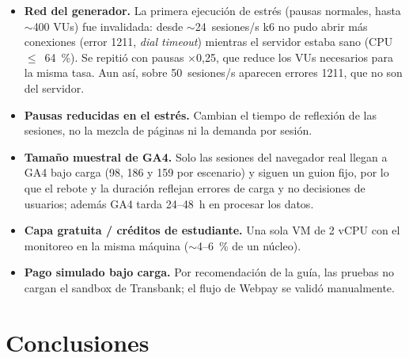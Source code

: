\documentclass[11pt,a4paper]{article}
\begin{document}
\begin{itemize}
  \item \textbf{Red del generador.} La primera ejecución de estrés (pausas
        normales, hasta $\sim$400 VUs) fue invalidada: desde $\sim$24~sesiones/s
        k6 no pudo abrir más conexiones (error 1211, \emph{dial timeout}) mientras
        el servidor estaba sano (CPU $\le$~64~\%). Se repitió con pausas
        $\times$0,25, que reduce los VUs necesarios para la misma tasa. Aun así,
        sobre 50~sesiones/s aparecen errores 1211, que no son del servidor.
  \item \textbf{Pausas reducidas en el estrés.} Cambian el tiempo de reflexión de
        las sesiones, no la mezcla de páginas ni la demanda por sesión.
  \item \textbf{Tamaño muestral de GA4.} Solo las sesiones del navegador real
        llegan a GA4 bajo carga (98, 186 y 159 por escenario) y siguen un
        guion fijo, por lo que el rebote y la duración reflejan errores de
        carga y no decisiones de usuarios; además GA4 tarda 24--48~h en
        procesar los datos.
  \item \textbf{Capa gratuita / créditos de estudiante.} Una sola VM de 2 vCPU
        con el monitoreo en la misma máquina ($\sim$4--6~\% de un núcleo).
  \item \textbf{Pago simulado bajo carga.} Por recomendación de la guía, las
        pruebas no cargan el sandbox de Transbank; el flujo de Webpay se validó
        manualmente.
\end{itemize}

\section{Conclusiones}
\end{document}
